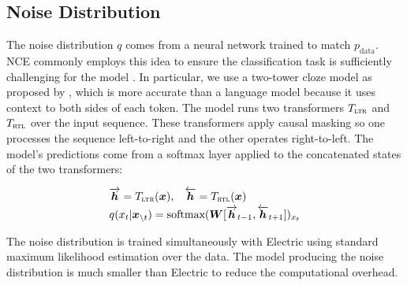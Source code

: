 \documentclass[11pt,a4paper]{article}
\newcommand{\alns}[1] {
	\begin{align*} #1 \end{align*}
}
\newcommand{\bx}{\bm{x}}
\newcommand{\bh}{\bm{h}}
\newcommand{\cntxt}{\bx_{\backslash t}}
\newcommand{\hf} { \overrightarrow{\bh} }
\newcommand{\hb} { \overleftarrow{\bh} }
\begin{document}
\subsection{Noise Distribution}
The noise distribution $q$ comes from a neural network trained to match $p_\text{data}$.
NCE commonly employs this idea to ensure the classification task is sufficiently challenging for the model \citep{Gutmann2010NoisecontrastiveEA,Wang2018LearningNT}. 
In particular, we use a two-tower cloze model as proposed by \citet{baevski2019cloze}, which is more accurate than a language model because it uses context to both sides of each token.
The model runs two transformers $T_{\textsc{ltr}}$ and $T_{\textsc{rtl}}$ over the input sequence. These transformers apply causal masking so one processes the sequence left-to-right and the other operates right-to-left.
The model's predictions come from a softmax layer applied to the concatenated states of the two transformers:
\alns{
    &\hf = T_{\textsc{ltr}}(\bx), \hspace{3mm} \hb = T_{\textsc{rtl}}(\bx) \\[-2pt]
    &\vspace{-15mm}q(x_t | \cntxt) = \text{softmax}(\bm{W} [\hf_{t - 1}, \hb_{t + 1}])_{x_t} 
}
\noindent The noise distribution is trained simultaneously with Electric using standard maximum likelihood estimation over the data.
The model producing the noise distribution is much smaller than Electric to reduce the computational overhead. 
\end{document}
